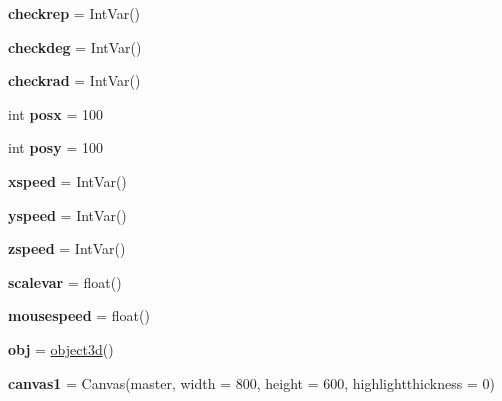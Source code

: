 \begin{DoxyCompactItemize}
\item 
\mbox{\label{namespacelatest_abc5791d59c22e90eb5c2dde0cd11c429}} 
{\bfseries checkrep} = Int\+Var()
\item 
\mbox{\label{namespacelatest_a80a6af01fa9f607badfb1fda65401981}} 
{\bfseries checkdeg} = Int\+Var()
\item 
\mbox{\label{namespacelatest_a6c065d2053612e1450743f51fd0dec72}} 
{\bfseries checkrad} = Int\+Var()
\item 
\mbox{\label{namespacelatest_a507683c8a5d901a4419f13a694fc2d32}} 
int {\bfseries posx} = 100
\item 
\mbox{\label{namespacelatest_a68f5b792e465b8805f7327d9db3b96bf}} 
int {\bfseries posy} = 100
\item 
\mbox{\label{namespacelatest_a4a6a6c25a7893053666f0fef80cf4567}} 
{\bfseries xspeed} = Int\+Var()
\item 
\mbox{\label{namespacelatest_aeb02a139a3ee4e07fe46ea25d619c379}} 
{\bfseries yspeed} = Int\+Var()
\item 
\mbox{\label{namespacelatest_a78a7eba90c91e11c0d8af7fe19c7d12e}} 
{\bfseries zspeed} = Int\+Var()
\item 
\mbox{\label{namespacelatest_a790aea071fa848481c88f6b248b85143}} 
{\bfseries scalevar} = float()
\item 
\mbox{\label{namespacelatest_a8124a178b956bce5ac2798d69f24c48c}} 
{\bfseries mousespeed} = float()
\item 
\mbox{\label{namespacelatest_a0622e327497a83cd434d6dc8fed3bc23}} 
{\bfseries obj} = \hyperlink{classlatest_1_1object3d}{object3d}()
\item 
\mbox{\label{namespacelatest_a68e9379208e313da2647f8d3cee7c3a5}} 
{\bfseries canvas1} = Canvas(master, width = 800, height = 600, highlightthickness = 0)
\item 

\end{DoxyCompactItemize}
